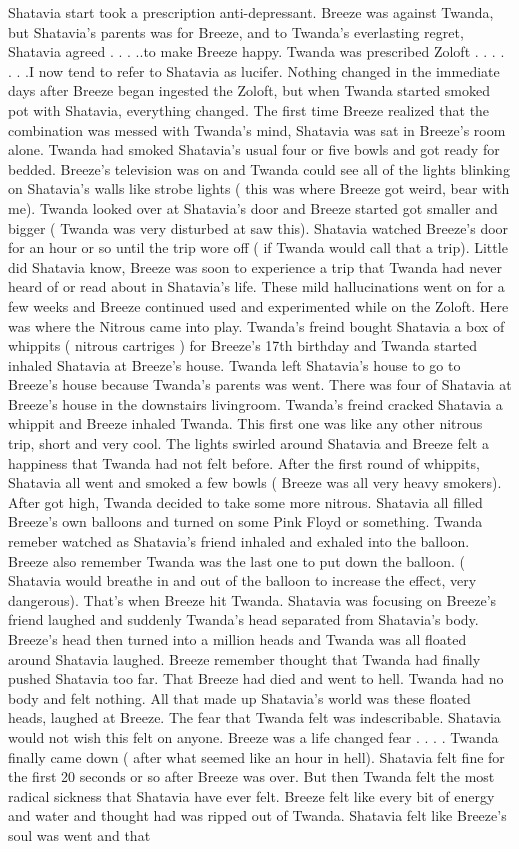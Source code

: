 \documentclass[12pt]{book}
\begin{document}
Shatavia start took a prescription anti-depressant. Breeze was against Twanda, but Shatavia's parents was for Breeze, and to Twanda's everlasting regret, Shatavia agreed . . .  ..to make Breeze happy. Twanda was prescribed Zoloft . . .   . . .  .I now tend to refer to Shatavia as lucifer. Nothing changed in the immediate days after Breeze began ingested the Zoloft, but when Twanda started smoked pot with Shatavia, everything changed. The first time Breeze realized that the combination was messed with Twanda's mind, Shatavia was sat in Breeze's room alone. Twanda had smoked Shatavia's usual four or five bowls and got ready for bedded. Breeze's television was on and Twanda could see all of the lights blinking on Shatavia's walls like strobe lights ( this was where Breeze got weird, bear with me). Twanda looked over at Shatavia's door and Breeze started got smaller and bigger ( Twanda was very disturbed at saw this). Shatavia watched Breeze's door for an hour or so until the trip wore off ( if Twanda would call that a trip). Little did Shatavia know, Breeze was soon to experience a trip that Twanda had never heard of or read about in Shatavia's life. These mild hallucinations went on for a few weeks and Breeze continued used and experimented while on the Zoloft. Here was where the Nitrous came into play. Twanda's freind bought Shatavia a box of whippits ( nitrous cartriges ) for Breeze's 17th birthday and Twanda started inhaled Shatavia at Breeze's house. Twanda left Shatavia's house to go to Breeze's house because Twanda's parents was went. There was four of Shatavia at Breeze's house in the downstairs livingroom. Twanda's freind cracked Shatavia a whippit and Breeze inhaled Twanda. This first one was like any other nitrous trip, short and very cool. The lights swirled around Shatavia and Breeze felt a happiness that Twanda had not felt before. After the first round of whippits, Shatavia all went and smoked a few bowls ( Breeze was all very heavy smokers). After got high, Twanda decided to take some more nitrous. Shatavia all filled Breeze's own balloons and turned on some Pink Floyd or something. Twanda remeber watched as Shatavia's friend inhaled and exhaled into the balloon. Breeze also remember Twanda was the last one to put down the balloon. ( Shatavia would breathe in and out of the balloon to increase the effect, very dangerous). That's when Breeze hit Twanda. Shatavia was focusing on Breeze's friend laughed and suddenly Twanda's head separated from Shatavia's body. Breeze's head then turned into a million heads and Twanda was all floated around Shatavia laughed. Breeze remember thought that Twanda had finally pushed Shatavia too far. That Breeze had died and went to hell. Twanda had no body and felt nothing. All that made up Shatavia's world was these floated heads, laughed at Breeze. The fear that Twanda felt was indescribable. Shatavia would not wish this felt on anyone. Breeze was a life changed fear . . .  . Twanda finally came down ( after what seemed like an hour in hell). Shatavia felt fine for the first 20 seconds or so after Breeze was over. But then Twanda felt the most radical sickness that Shatavia have ever felt. Breeze felt like every bit of energy and water and thought had was ripped out of Twanda. Shatavia felt like Breeze's soul was went and that 
\end{document}
